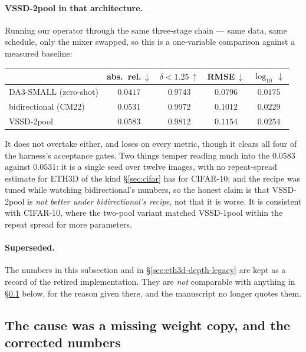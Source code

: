 \documentclass[11pt,a4paper]{article}
\begin{document}
\paragraph{VSSD-2pool in that architecture.} Running our operator through the
same three-stage chain --- same data, same schedule, only the mixer swapped, so this is a
one-variable comparison against a measured baseline:

\begin{center}\small
\begin{tabular}{lcccc}
\toprule
 & abs.\ rel.\,$\downarrow$ & $\delta{<}1.25$\,$\uparrow$ & RMSE\,$\downarrow$ & $\log_{10}$\,$\downarrow$ \\
\midrule
DA3-SMALL (zero-shot)      & $\mathbf{0.0417}$ & $0.9743$ & $\mathbf{0.0796}$ & $\mathbf{0.0175}$ \\
bidirectional (CM22)       & $0.0531$ & $\mathbf{0.9972}$ & $0.1012$ & $0.0229$ \\
VSSD-2pool        & $0.0583$ & $0.9812$ & $0.1154$ & $0.0254$ \\
\bottomrule
\end{tabular}
\end{center}

\noindent It does not overtake either, and loses on every metric, though it clears all four
of the harness's acceptance gates. Two things temper reading much into the $0.0583$ against
$0.0531$: it is a single seed over twelve images, with no repeat-spread estimate for ETH3D
of the kind \S\ref{sec:cifar} has for CIFAR-10; and the recipe was tuned while watching
bidirectional's numbers, so the honest claim is that VSSD-2pool is \emph{not
better under bidirectional's recipe}, not that it is worse. It is consistent with CIFAR-10,
where the two-pool variant matched VSSD-1pool within the repeat spread for more
parameters.

\paragraph{Superseded.} The numbers in this subsection and in
\S\ref{sec:eth3d-depth-legacy} are kept as a record of the retired implementation. They are
\emph{not} comparable with anything in \S\ref{sec:eth3d-fixed} below, for the reason given
there, and the manuscript no longer quotes them.

\subsection{The cause was a missing weight copy, and the corrected numbers}
\label{sec:eth3d-fixed}
\end{document}
